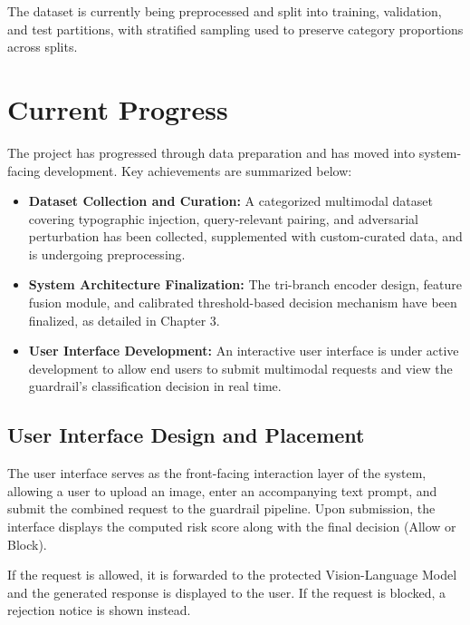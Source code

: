 The dataset is currently being preprocessed and split into training,
validation, and test partitions, with stratified sampling used to preserve
category proportions across splits.


\section{Current Progress}

The project has progressed through data preparation and has moved into
system-facing development. Key achievements are summarized below:

\begin{itemize}

    \item \textbf{Dataset Collection and Curation:}
    A categorized multimodal dataset covering typographic injection,
    query-relevant pairing, and adversarial perturbation has been collected,
    supplemented with custom-curated data, and is undergoing preprocessing.

    \item \textbf{System Architecture Finalization:}
    The tri-branch encoder design, feature fusion module, and calibrated
    threshold-based decision mechanism have been finalized, as detailed
    in Chapter 3.

    \item \textbf{User Interface Development:}
    An interactive user interface is under active development to allow
    end users to submit multimodal requests and view the guardrail's
    classification decision in real time.

\end{itemize}


\subsection{User Interface Design and Placement}

The user interface serves as the front-facing interaction layer of the
system, allowing a user to upload an image, enter an accompanying text
prompt, and submit the combined request to the guardrail pipeline. Upon
submission, the interface displays the computed risk score along with the
final decision (Allow or Block).

If the request is allowed, it is forwarded to the protected
Vision-Language Model and the generated response is displayed to the user.
If the request is blocked, a rejection notice is shown instead.


